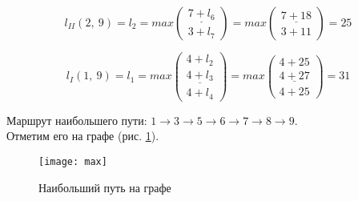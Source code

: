 \begin{equation*}
	l_{II}(2,\ 9) = l_2 = max \begin{pmatrix} \underline{7 + l_6} \\ 3 + l_7 \end{pmatrix} = max \begin{pmatrix} \underline{7 + 18} \\ 3 + 11 \end{pmatrix} = 25
\end{equation*}

\begin{equation*}
	l_{I}(1,\ 9) = l_1 = max \begin{pmatrix} 4 + l_2 \\ \underline{4 + l_3} \\ 4 + l_4 \end{pmatrix} = max \begin{pmatrix} 4 + 25 \\ \underline{4 + 27} \\ 4 + 25 \end{pmatrix} = 31
\end{equation*}

Маршрут наибольшего пути: $1 \rightarrow 3 \rightarrow 5 \rightarrow 6 \rightarrow 7 \rightarrow 8 \rightarrow 9$.\\ Отметим его на графе (рис. \ref{pic:max}).

\begin{figure}[H]
\begin{center}
	\texttt{[image: max]}
	\caption{Наибольший путь на графе}
	\label{pic:max}
\end{center}
\end{figure}

